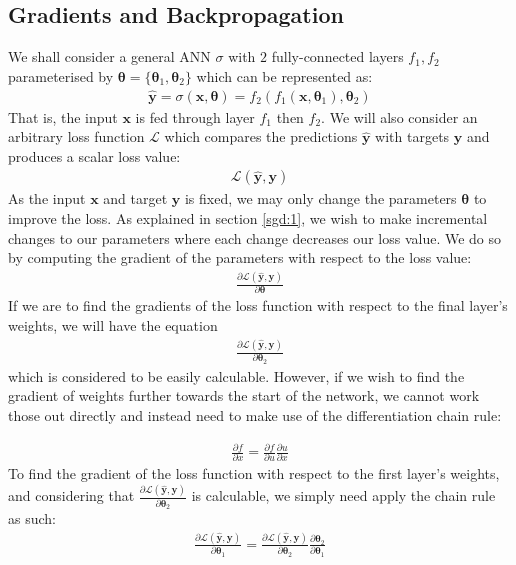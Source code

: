 \documentclass{report}
\begin{document}
	\subsection{Gradients and Backpropagation} \label{backprop:1}
	We shall consider a general ANN $\sigma$ with $2$ fully-connected layers $f_1, f_2$ parameterised by $\bm{\theta} = \{\bm{\theta}_1, \bm{\theta}_2\}$ which can be represented as:
	\begin{align} \label{gradients:1}
	 \bm{\hat{y}} = \sigma(\bm{x}, \bm{\theta}) = f_2(f_1(\bm{x},  \bm{\theta}_1), \bm{\theta}_2)
	\end{align}
	That is, the input $\bm{x}$ is fed through layer $f_1$ then $f_2$. We will also consider an arbitrary loss function $\mathcal{L}$ which compares the predictions $\bm{\hat{y}}$ with targets $\bm{y}$ and produces a scalar loss value:
	\begin{align}
	 \mathcal{L}(\bm{\hat{y}}, \bm{y})
	\end{align}
	As the input $\bm{x}$ and target $\bm{y}$ is fixed, we may only change the parameters $\bm{\theta}$ to improve the loss. As explained in section \ref{sgd:1}, we wish to make incremental changes to our parameters where each change decreases our loss value. We do so by computing the gradient of the parameters with respect to the loss value:
	\begin{align}
	 \frac{\partial\mathcal{L}(\bm{\hat{y}},\bm{y})}
	 {\partial\bm{\theta}}
	\end{align}
	If we are to find the gradients of the loss function with respect to the final layer's weights, we will have the equation
	\begin{align}
	\frac{\partial\mathcal{L}(\bm{\hat{y}},\bm{y})}
	{\partial\bm{\theta}_2}
	\end{align}
	which is considered to be easily calculable. However, if we wish to find the gradient of weights further towards the start of the network, we cannot work those out directly and instead need to make use of the differentiation chain rule: \par
	\begin{align}
	\frac{\partial f}{\partial x} = \frac{\partial f}{\partial u} \frac{\partial u}{\partial x}
	\end{align}
	To find the gradient of the loss function with respect to the first layer's weights, and considering that $\frac{\partial\mathcal{L}(\bm{\hat{y}},\bm{y})}
	{\partial\bm{\theta}_2}$ is calculable, we simply need apply the chain rule as such:
	\begin{align}
	\frac{\partial\mathcal{L}(\bm{\hat{y}},\bm{y})}{\partial\bm{\theta}_1} =
	\frac{\partial\mathcal{L}(\bm{\hat{y}},\bm{y})}
	{\partial\bm{\theta}_2}
	\frac{\partial\bm{\theta}_2}
	{\partial\bm{\theta}_1} 
	\end{align}
\end{document}
